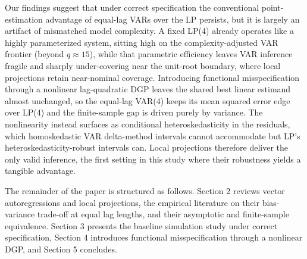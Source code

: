 Our findings suggest that under correct specification the conventional point-estimation 
advantage of equal-lag VARs over the LP persists, but it is largely an artifact of mismatched 
model complexity. A fixed LP(4) already operates like a highly parameterized system, 
sitting high on the complexity-adjusted VAR frontier (beyond $q \approx 15$), while that 
parametric efficiency leaves VAR inference fragile and sharply under-covering near the 
unit-root boundary, where local projections retain near-nominal coverage. Introducing 
functional misspecification through a nonlinear lag-quadratic DGP leaves the shared best 
linear estimand almost unchanged, so the equal-lag VAR(4) keeps its mean squared error 
edge over LP(4) and the finite-sample gap is driven purely by variance. The nonlinearity 
instead surfaces as conditional heteroskedasticity in the residuals, which homoskedastic 
VAR delta-method intervals cannot accommodate but LP's heteroskedasticity-robust intervals 
can. Local projections therefore deliver the only valid inference, the first setting in 
this study where their robustness yields a tangible advantage.

The remainder of the paper is structured as follows. Section 2 reviews vector autoregressions 
and local projections, the empirical literature on their bias-variance trade-off at equal lag 
lengths, and their asymptotic and finite-sample equivalence. Section 3 presents the baseline 
simulation study under correct specification, Section 4 introduces functional misspecification 
through a nonlinear DGP, and Section 5 concludes.
\FloatBarrier
